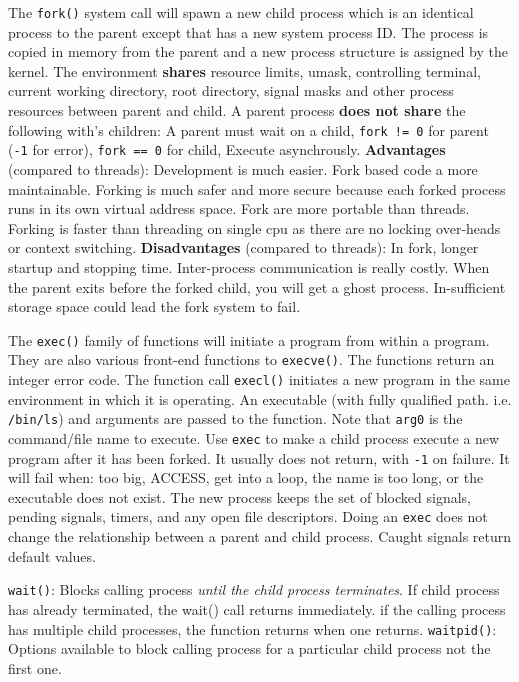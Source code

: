 \documentclass[10pt,landscape, a4paper]{article}
\begin{document}
\begin{multicols}{3}
The \texttt{fork()} system call will spawn a new child process which is an 
identical process to the parent except that has a new system process ID. 
The process is copied in memory from the parent and a new process structure 
is assigned by the kernel. 
The environment \textbf{shares} resource limits, umask, controlling terminal, 
current working directory, root directory, signal masks and other 
process resources between parent and child.
A parent process \textbf{does not share} the following with's children:
A parent must wait on a child,
\texttt{fork != 0} for parent (\texttt{-1} for error),
\texttt{fork == 0} for child,
Execute asynchrously.
\textbf{Advantages} (compared to threads):
Development is much easier.
Fork based code a more maintainable.
Forking is much safer and more secure because each forked process runs in its own virtual address space.
Fork are more portable than threads.
Forking is faster than threading on single cpu as there are no locking over-heads or context switching.
\textbf{Disadvantages} (compared to threads):
In fork, longer startup and stopping time.
Inter-process communication is really costly.
When the parent exits before the forked child, you will get a ghost process.
In-sufficient storage space could lead the fork system to fail.



The \texttt{exec()} family of functions will initiate a program from within a program. 
They are also various front-end functions to \texttt{execve()}.
The functions return an integer error code.
The function call \texttt{execl()} initiates a new program in the same environment 
in which it is operating. An executable (with fully qualified path. i.e. \texttt{/bin/ls}) 
and arguments are passed to the function. Note that \texttt{arg0} is the command/file 
name to execute.
Use \texttt{exec} to make a child process execute a new program
after it has been forked. It usually does not return, with \texttt{-1}
on failure. It will fail when: too big, ACCESS, get into a loop, the name
is too long, or the executable does not exist. The new process keeps the
set of blocked signals, pending signals, timers, and any open file 
descriptors. Doing an \texttt{exec} does not change the relationship
between a parent and child process. Caught signals return default values.



\texttt{wait()}: Blocks calling process \emph{until the child process terminates}. 
If child process has already terminated, the wait() call returns immediately. 
if the calling process has multiple child processes, the function returns when one returns.
\texttt{waitpid()}: Options available to block calling process for a particular 
child process not the first one.


\end{multicols}
\end{document}
